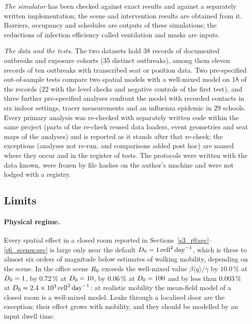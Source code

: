\emph{The simulator} has been checked against exact results and against a separately written implementation;
the scene and intervention results are obtained from it. Barriers, occupancy and schedules are outputs of these simulations; the
reductions of infection efficiency called ventilation and masks are inputs.

\emph{The data and the tests.} The two datasets hold 38 records of documented outbreaks and exposure cohorts
(35 distinct outbreaks), among them eleven records of ten outbreaks with transcribed seat or position data. Two
pre-specified out-of-sample tests compare two spatial models with a well-mixed model on 18 of the records (22 with
the level checks and negative controls of the first test), and
three further pre-specified analyses confront the model with recorded contacts in six indoor settings, tracer
measurements and an influenza epidemic in 29 schools. Every primary analysis was re-checked with separately
written code within the same project (parts of the re-check reused data loaders, event geometries and seat maps
of the analyses) and is reported as it stands after that re-check; the
exceptions (analyses not re-run, and comparisons added post hoc) are named where they occur and in the register
of tests. The protocols were written with the data known, were frozen by file hashes on the author's machine and
were not lodged with a registry.

\subsection{Limits}\label{s9_discussion:sec:limits}

\paragraph{Physical regime.} Every spatial effect in a closed room reported in
Sections~\ref{s3_r0:sec}--\ref{s6_scenes:sec} is large only near the default $D_0=1\,\mathrm{cell}^2\,\mathrm{day}^{-1}$, which is three to
almost six orders of magnitude below estimates of walking mobility, depending on the scene. In the office scene
$R_0$ exceeds the well-mixed value $\beta\langle q\rangle/\gamma$ by $10.0\,\%$ at $D_0=1$, by $0.72\,\%$ at
$D_0=10$, by $0.06\,\%$ at $D_0=100$ and by less than $0.003\,\%$ at $D_0=2.4\times10^{3}\,\mathrm{cell}^2\,\mathrm{day}^{-1}$: at realistic
mobility the mean-field model of a closed room is a well-mixed model. Leaks through a localised door are the
exception; their effect grows with mobility, and they should be modelled by an input dwell time.

